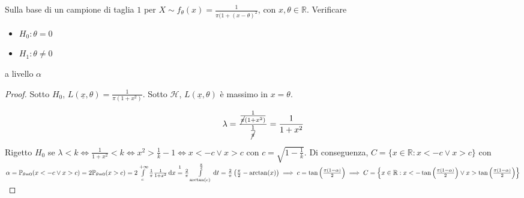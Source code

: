 \documentclass[hidelinks, 10pt]{report}
\begin{document}
\begin{ex}
Sulla base di un campione di taglia $ 1 $ per $ X \sim f_{\theta} (x) = \frac{1}{\pi (1 + (x - \theta)^{2}} $, con $ x, \theta \in \mathbb{R} $. Verificare
\begin{itemize}
\item $ H_{0}: \theta = 0 $
\item $ H_{1}: \theta \ne 0 $
\end{itemize}
a livello $ \alpha $
\end{ex}

\begin{proof}
Sotto $ H_{0} $, $ L (\underline{x}, \theta) = \frac{1}{\pi (1 + x^{2})} $. Sotto $ \mathcal{H} $, $ L(\underline{x}, \theta) $ \`e massimo in $ x = \theta $.

\[ \lambda = \frac{\frac{1}{\cancel{\pi} (1 + x^{2})}}{\frac{1}{\cancel{\pi}}} = \frac{1}{1 + x^{2}} \]

Rigetto $ H_{0} $ se $ \lambda < k \iff \frac{1}{1 + x^{2}} < k \iff x^{2} > \frac{1}{k} - 1 \iff x < -c \lor x > c $ con $ c = \sqrt{1 - \frac{1}{k}} $. Di conseguenza, $ C = \{ x \in \mathbb{R} : x < -c \lor x > c \} $ con $ \alpha = \mathbb{P}_{\theta = 0} (x < -c \lor x > c) = 2 \mathbb{P}_{\theta = 0} (x > c) = 2 \int\limits_{c}^{+\infty} \frac{1}{\pi} \frac{1}{1 + x^{2}} \, \mathrm{d}x \stackrel{\footnotemark[1]}{=} \frac{2}{\pi} \int\limits_{\arctan(c)}^{\frac{\pi}{2}} \, \mathrm{d}t = \frac{2}{\pi} \left( \frac{\pi}{2} - \arctan(x) \right) \implies c = \tan \left( \frac{\pi (1 - \alpha)}{2} \right) \implies C= \left\{ x \in \mathbb{R} : x < - \tan \left( \frac{\pi (1 - \alpha)}{2} \right) \lor x > \tan \left( \frac{\pi (1 - \alpha)}{2} \right) \right\} $

\end{proof}
\end{document}

